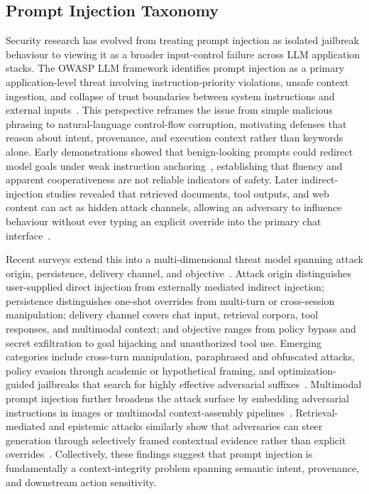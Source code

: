 \documentclass{article}
\begin{document}
\subsection{Prompt Injection Taxonomy}
\label{sec:rw-taxonomy}

Security research has evolved from treating prompt injection as isolated jailbreak behaviour to viewing it as a broader input-control failure across LLM application stacks.
The OWASP LLM framework identifies prompt injection as a primary application-level threat involving instruction-priority violations, unsafe context ingestion, and collapse of trust boundaries between system instructions and external inputs~\cite{owasp_llm}.
This perspective reframes the issue from simple malicious phrasing to natural-language control-flow corruption, motivating defenses that reason about intent, provenance, and execution context rather than keywords alone.
Early demonstrations showed that benign-looking prompts could redirect model goals under weak instruction anchoring~\cite{perez2022ignore}, establishing that fluency and apparent cooperativeness are not reliable indicators of safety.
Later indirect-injection studies revealed that retrieved documents, tool outputs, and web content can act as hidden attack channels, allowing an adversary to influence behaviour without ever typing an explicit override into the primary chat interface~\cite{greshake2023indirect}.

Recent surveys extend this into a multi-dimensional threat model spanning attack origin, persistence, delivery channel, and objective~\cite{11359704,correia2026systematic,yi2024jailbreak}.
Attack origin distinguishes user-supplied direct injection from externally mediated indirect injection; persistence distinguishes one-shot overrides from multi-turn or cross-session manipulation; delivery channel covers chat input, retrieval corpora, tool responses, and multimodal context; and objective ranges from policy bypass and secret exfiltration to goal hijacking and unauthorized tool use.
Emerging categories include cross-turn manipulation, paraphrased and obfuscated attacks, policy evasion through academic or hypothetical framing, and optimization-guided jailbreaks that search for highly effective adversarial suffixes~\cite{yi2024jailbreak}.
Multimodal prompt injection further broadens the attack surface by embedding adversarial instructions in images or multimodal context-assembly pipelines~\cite{yeo2025multimodal}.
Retrieval-mediated and epistemic attacks similarly show that adversaries can steer generation through selectively framed contextual evidence rather than explicit overrides~\cite{wu2025epistemic,greshake2023indirect}.
Collectively, these findings suggest that prompt injection is fundamentally a context-integrity problem spanning semantic intent, provenance, and downstream action sensitivity.
\end{document}
